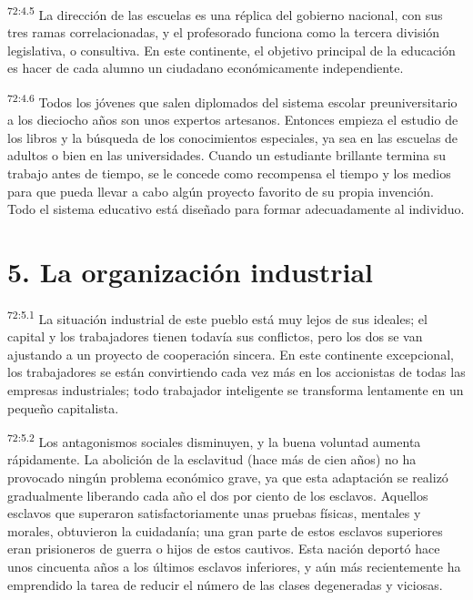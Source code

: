 \documentclass[twoside, 11pt]{book}
\begin{document}
\par
\textsuperscript{72:4.5} La dirección de las escuelas es una réplica del gobierno nacional, con sus tres ramas correlacionadas, y el profesorado funciona como la tercera división legislativa, o consultiva. En este continente, el objetivo principal de la educación es hacer de cada alumno un ciudadano económicamente independiente.

\par
\textsuperscript{72:4.6} Todos los jóvenes que salen diplomados del sistema escolar preuniversitario a los dieciocho años son unos expertos artesanos. Entonces empieza el estudio de los libros y la búsqueda de los conocimientos especiales, ya sea en las escuelas de adultos o bien en las universidades. Cuando un estudiante brillante termina su trabajo antes de tiempo, se le concede como recompensa el tiempo y los medios para que pueda llevar a cabo algún proyecto favorito de su propia invención. Todo el sistema educativo está diseñado para formar adecuadamente al individuo.

\section*{5. La organización industrial}
\par
\textsuperscript{72:5.1} La situación industrial de este pueblo está muy lejos de sus ideales; el capital y los trabajadores tienen todavía sus conflictos, pero los dos se van ajustando a un proyecto de cooperación sincera. En este continente excepcional, los trabajadores se están convirtiendo cada vez más en los accionistas de todas las empresas industriales; todo trabajador inteligente se transforma lentamente en un pequeño capitalista.

\par
\textsuperscript{72:5.2} Los antagonismos sociales disminuyen, y la buena voluntad aumenta rápidamente. La abolición de la esclavitud (hace más de cien años) no ha provocado ningún problema económico grave, ya que esta adaptación se realizó gradualmente liberando cada año el dos por ciento de los esclavos. Aquellos esclavos que superaron satisfactoriamente unas pruebas físicas, mentales y morales, obtuvieron la cuidadanía; una gran parte de estos esclavos superiores eran prisioneros de guerra o hijos de estos cautivos. Esta nación deportó hace unos cincuenta años a los últimos esclavos inferiores, y aún más recientemente ha emprendido la tarea de reducir el número de las clases degeneradas y viciosas.
\end{document}

